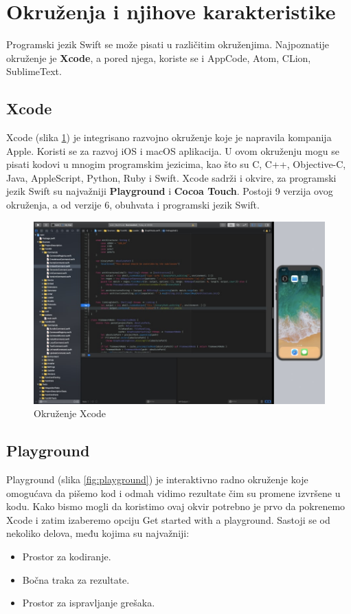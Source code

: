 \documentclass[a4paper]{article}
\begin{document}
\section{Okruženja i njihove karakteristike}	
\label{sec:cetvrtiDeo}
Programski jezik Swift se može pisati u različitim okruženjima. Najpoznatije okruženje je \textbf{Xcode}, a pored njega, koriste se i AppCode, Atom, CLion, SublimeText.

\subsection{Xcode}
\label{subsec:podnaslovXcode}
Xcode (slika \ref{fig:xcode}) je integrisano razvojno okruženje koje je napravila kompanija Apple. Koristi se za razvoj iOS i macOS aplikacija. U ovom okruženju mogu se pisati kodovi u mnogim programskim jezicima, kao što su C, C++, Objective-C, Java, AppleScript, Python, Ruby i Swift. Xcode sadrži i okvire, za programski jezik Swift su najvažniji \textbf{Playground} i \textbf{Cocoa Touch}. 
Postoji 9 verzija ovog okruženja, a od verzije 6, obuhvata i programski jezik Swift.

\begin{figure}[h!]
\begin{center}
\includegraphics[scale=0.2]{xcode.jpg}
\end{center}
\caption{Okruženje Xcode}
\label{fig:xcode}
\end{figure}


\subsection{Playground}
\label{subsec:podnaslovPlayground}
Playground (slika \ref{fig:playground}) je interaktivno radno okruženje koje omogućava da pišemo kod i odmah vidimo rezultate čim su promene izvršene u kodu. Kako bismo mogli da koristimo ovaj okvir potrebno je prvo da pokrenemo Xcode i zatim izaberemo opciju Get started with a playground.
Sastoji se od nekoliko delova, među kojima su najvažniji: 
\begin{itemize}
\item Prostor za kodiranje.
\item Bočna traka za rezultate.
\item Prostor za ispravljanje grešaka.
\end{itemize}
\end{document}

